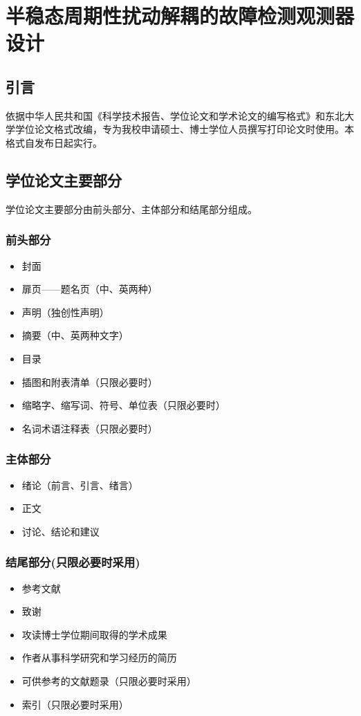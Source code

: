 \chapter{半稳态周期性扰动解耦的故障检测观测器设计}\label{chap:format}

\section{引言}
依据中华人民共和国《科学技术报告、学位论文和学术论文的编写格式》和东北大学学位论文格式改编，专为我校申请硕士、博士学位人员撰写打印论文时使用。本格式自发布日起实行。
\section{学位论文主要部分}
学位论文主要部分由前头部分、主体部分和结尾部分组成。
\subsection{前头部分}
\begin{itemize}
    \item 封面
    \item 扉页——题名页（中、英两种）
    \item 声明（独创性声明）
    \item 摘要（中、英两种文字）
    \item 目录
    \item 插图和附表清单（只限必要时）
    \item 缩略字、缩写词、符号、单位表（只限必要时）
    \item 名词术语注释表（只限必要时）
\end{itemize}

\subsection{主体部分}
\begin{itemize}
    \item 绪论（前言、引言、绪言）
    \item 正文
    \item 讨论、结论和建议
\end{itemize}
\subsection{结尾部分(只限必要时采用)}
\begin{itemize}
    \item 参考文献
    \item 致谢
    \item 攻读博士学位期间取得的学术成果
    \item 作者从事科学研究和学习经历的简历
    \item 可供参考的文献题录（只限必要时采用）
    \item 索引（只限必要时采用）
\end{itemize}

